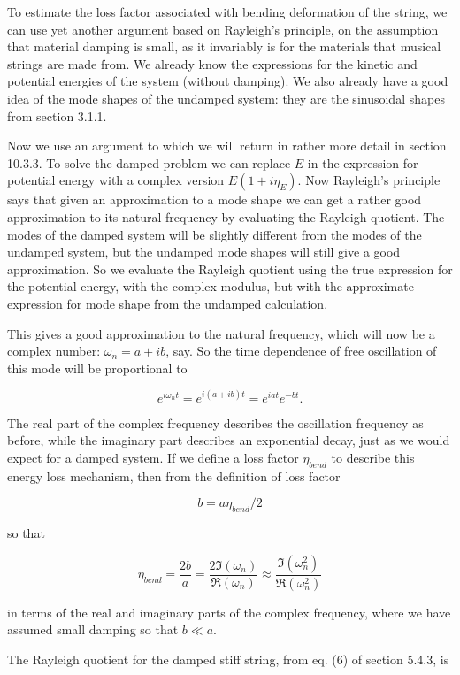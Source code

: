   To estimate the loss factor associated with bending deformation of the 
  string, we can use yet another argument based on Rayleigh's principle, on the 
  assumption that material damping is small, as it invariably is for the 
  materials that musical strings are made from. We already know the expressions 
  for the kinetic and potential energies of the system (without damping). We 
  also already have a good idea of the mode shapes of the undamped system: they 
  are the sinusoidal shapes from section 3.1.1. 

  Now we use an argument to which we will return in rather more detail in 
  section 10.3.3. To solve the damped problem we can replace $E$ in the 
  expression for potential energy with a complex version $E(1+i \eta_E)$. Now 
  Rayleigh’s principle says that given an approximation to a mode shape we can 
  get a rather good approximation to its natural frequency by evaluating the 
  Rayleigh quotient. The modes of the damped system will be slightly different 
  from the modes of the undamped system, but the undamped mode shapes will 
  still give a good approximation. So we evaluate the Rayleigh quotient using 
  the true expression for the potential energy, with the complex modulus, but 
  with the approximate expression for mode shape from the undamped calculation. 

  This gives a good approximation to the natural frequency, which will now be a 
  complex number: $\omega_n=a+ib$, say. So the time dependence of free 
  oscillation of this mode will be proportional to 

  $$e^{i \omega_n t}=e^{i(a+ib)t}=e^{iat} e^{-bt} .\tag{1}$$ 

  The real part of the complex frequency describes the oscillation frequency as 
  before, while the imaginary part describes an exponential decay, just as we 
  would expect for a damped system. If we define a loss factor $\eta_{bend}$ to 
  describe this energy loss mechanism, then from the definition of loss factor 

  $$b=a \eta_{bend}/2$$ 

  so that 

  $$\eta_{bend} = \frac{2b}{a} =\frac{2\Im (\omega_n)}{\Re (\omega_n)} \approx 
  \frac{\Im (\omega_n^2)}{\Re (\omega_n^2)} \tag{2}$$ 

  in terms of the real and imaginary parts of the complex frequency, where we 
  have assumed small damping so that $b \ll a$. 

  The Rayleigh quotient for the damped stiff string, from eq. (6) of section 
  5.4.3, is 


